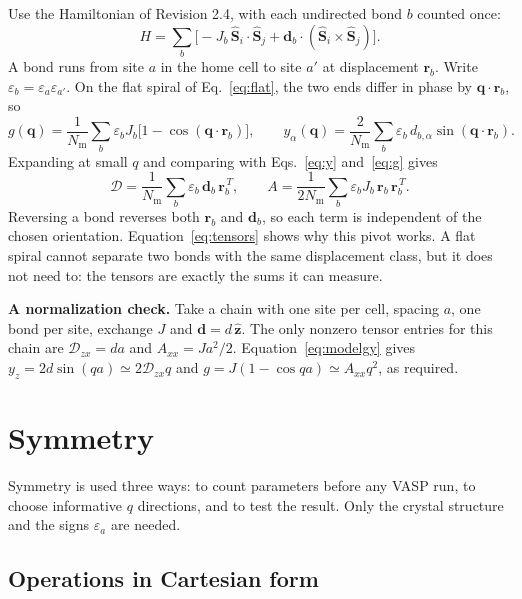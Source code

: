 \documentclass[11pt,a4paper]{article}
\numberwithin{equation}{section}
\newcommand{\vct}[1]{\bm{#1}}
\newcommand{\qh}{\vct q}
\newcommand{\Nm}{N_{\mathrm m}}
\newcommand{\Dt}{\mathcal D}
\begin{document}
Use the Hamiltonian of Revision 2.4, with each undirected bond $b$ counted once:
\begin{equation}\label{eq:ham}
 H=\sum_b\bigl[-J_b\,\hat{\vct S}_i\cdot\hat{\vct S}_j
 +\vct d_b\cdot(\hat{\vct S}_i\times\hat{\vct S}_j)\bigr].
\end{equation}
A bond runs from site $a$ in the home cell to site $a'$ at displacement
$\vct r_b$. Write $\varepsilon_b=\varepsilon_a\varepsilon_{a'}$. On the flat
spiral of Eq.~\eqref{eq:flat}, the two ends differ in phase by
$\qh\cdot\vct r_b$, so
\begin{equation}\label{eq:modelgy}
 g(\qh)=\frac{1}{\Nm}\sum_b\varepsilon_bJ_b\bigl[1-\cos(\qh\cdot\vct r_b)\bigr],
 \qquad
 y_\alpha(\qh)=\frac{2}{\Nm}\sum_b\varepsilon_b\,d_{b,\alpha}\sin(\qh\cdot\vct r_b).
\end{equation}
Expanding at small $q$ and comparing with Eqs.~\eqref{eq:y} and~\eqref{eq:g} gives
\begin{equation}\label{eq:tensors}
 \boxed{\Dt=\frac{1}{\Nm}\sum_b\varepsilon_b\,\vct d_b\,\vct r_b^{\,T},
 \qquad
 A=\frac{1}{2\Nm}\sum_b\varepsilon_bJ_b\,\vct r_b\,\vct r_b^{\,T}.}
\end{equation}
Reversing a bond reverses both $\vct r_b$ and $\vct d_b$, so each term is
independent of the chosen orientation. Equation~\eqref{eq:tensors} shows why
this pivot works. A flat spiral cannot separate two bonds with the same
displacement class, but it does not need to: the tensors are exactly the sums it
can measure.

\textbf{A normalization check.} Take a chain with one site per cell, spacing
$a$, one bond per site, exchange $J$ and $\vct d=d\,\hat{\vct z}$. The only
nonzero tensor entries for this chain are $\Dt_{zx}=da$ and $A_{xx}=Ja^2/2$.
Equation~\eqref{eq:modelgy} gives $y_z=2d\sin(qa)\simeq2\Dt_{zx}q$ and
$g=J(1-\cos qa)\simeq A_{xx}q^2$, as required.

\section{Symmetry}\label{sec:symmetry}

Symmetry is used three ways: to count parameters before any VASP run, to choose
informative $q$ directions, and to test the result. Only the crystal structure
and the signs $\varepsilon_a$ are needed.

\subsection{Operations in Cartesian form}
\end{document}
